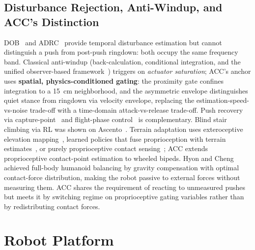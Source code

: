 \documentclass[conference]{IEEEtran}
\begin{document}
\subsection{Disturbance Rejection, Anti-Windup, and ACC's Distinction}
DOB~\cite{ohnishi1993dob,chen2000dob} and ADRC~\cite{han2009adrc,feng2023lqradrc} provide temporal disturbance estimation but cannot distinguish a push from post-push ringdown: both occupy the same frequency band.
Classical anti-windup (back-calculation, conditional integration, and the unified observer-based framework~\cite{astrom1989windup,kothare1994antiwindup,tarbouriech2009aw}) triggers on \emph{actuator saturation}; ACC's anchor uses \textbf{spatial, physics-conditioned gating}: the proximity gate confines integration to a \SI{15}{cm} neighborhood, and the asymmetric envelope distinguishes quiet stance from ringdown via velocity envelope, replacing the estimation-speed-vs-noise trade-off with a time-domain attack-vs-release trade-off.
Push recovery via capture-point~\cite{englsberger2015dcm,pratt2006capturepoint} and flight-phase control~\cite{roscia2023flight} is complementary.
Blind stair climbing via RL was shown on Ascento~\cite{chamorro2024stairclimbing}.
Terrain adaptation uses exteroceptive elevation mapping~\cite{legged_terrain_extero,fankhauser2018rough}, learned policies that fuse proprioception with terrain estimates~\cite{lee2020challenging,miki2022perceptive}, or purely proprioceptive contact sensing~\cite{blind_terrain_proprio,bellicoso2016terrain,camurri2017contact}; ACC extends proprioceptive contact-point estimation to wheeled bipeds.
Hyon and Cheng~\cite{hyon2007gated} achieved full-body humanoid balancing by gravity compensation with optimal contact-force distribution, making the robot passive to external forces without measuring them. ACC shares the requirement of reacting to unmeasured pushes but meets it by switching regime on proprioceptive gating variables rather than by redistributing contact forces.

\section{Robot Platform}
\end{document}
